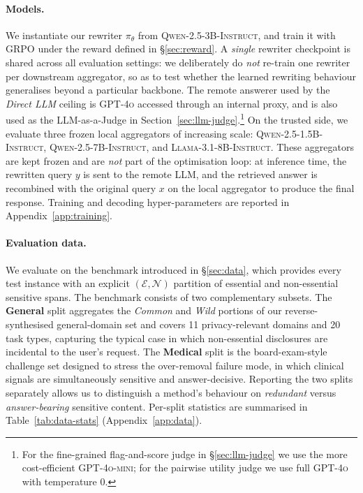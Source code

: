 \paragraph{Models.}
We instantiate our rewriter $\pi_\theta$ from
\textsc{Qwen-2.5-3B-Instruct}, and train it with GRPO under the reward
defined in \S\ref{sec:reward}. A \emph{single} rewriter checkpoint is
shared across all evaluation settings: we deliberately do \emph{not}
re-train one rewriter per downstream aggregator, so as to test whether
the learned rewriting behaviour generalises beyond a particular
backbone. The remote answerer used by the \textit{Direct LLM} ceiling
is \textsc{GPT-4o} accessed through an internal proxy, and is also
used as the LLM-as-a-Judge in
Section~\ref{sec:llm-judge}.\footnote{For the fine-grained
flag-and-score judge in \S\ref{sec:llm-judge} we use the more
cost-efficient \textsc{GPT-4o-mini}; for the pairwise utility judge we
use full \textsc{GPT-4o} with temperature $0$.} On the trusted side,
we evaluate three frozen local aggregators of increasing scale:
\textsc{Qwen-2.5-1.5B-Instruct}, \textsc{Qwen-2.5-7B-Instruct}, and
\textsc{Llama-3.1-8B-Instruct}. These aggregators are kept frozen and
are \emph{not} part of the optimisation loop: at inference time, the
rewritten query $y$ is sent to the remote LLM, and the retrieved
answer is recombined with the original query $x$ on the local
aggregator to produce the final response. Training and decoding
hyper-parameters are reported in Appendix~\ref{app:training}.

\paragraph{Evaluation data.}
We evaluate on the benchmark introduced in \S\ref{sec:data}, which
provides every test instance with an explicit
$(\mathcal{E},\mathcal{N})$ partition of essential and non-essential
sensitive spans. The benchmark consists of two complementary subsets.
The \textbf{General} split aggregates the \emph{Common} and
\emph{Wild} portions of our reverse-synthesised general-domain set and
covers 11 privacy-relevant domains and 20 task types, capturing the
typical case in which non-essential disclosures are incidental to the
user's request. The \textbf{Medical} split is the board-exam-style
challenge set designed to stress the over-removal failure mode, in
which clinical signals are simultaneously sensitive and
answer-decisive. Reporting the two splits separately allows us to
distinguish a method's behaviour on \emph{redundant} versus
\emph{answer-bearing} sensitive content. Per-split statistics are
summarised in Table~\ref{tab:data-stats} (Appendix~\ref{app:data}).


